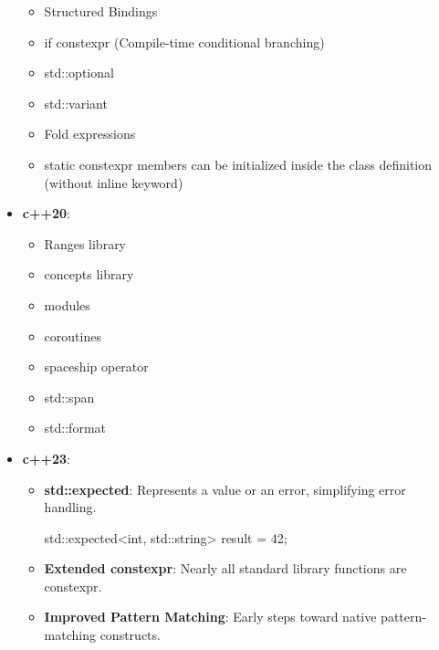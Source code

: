 \documentclass{report}
\begin{document}
\begin{itemize}
        \begin{itemize}
            \item Structured Bindings
            \item if constexpr (Compile-time conditional branching)
            \item std::optional
            \item std::variant
            \item Fold expressions
            \item static constexpr members can be initialized inside the class definition (without inline keyword)
        \end{itemize}
    \item \textbf{c++20}: 
        \begin{itemize}
            \item Ranges library
            \item concepts library
            \item modules
            \item coroutines
            \item spaceship operator
            \item std::span
            \item std::format
        \end{itemize}
    \item \textbf{c++23}: 
        \begin{itemize}
            \item \textbf{std::expected}: Represents a value or an error, simplifying error handling.
                \bigbreak \noindent 
                \begin{cppcode}
                std::expected<int, std::string> result = 42;
                \end{cppcode}
            \item \textbf{Extended constexpr}: Nearly all standard library functions are constexpr.
            \item \textbf{Improved Pattern Matching}: Early steps toward native pattern-matching constructs.
        \end{itemize}
\end{itemize}

























    
\end{document}
